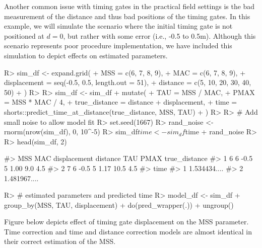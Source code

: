 \documentclass[
]{jss}
\begin{document}
Another common issue with timing gates in the practical field settings is the bad measurement of the distance and thus bad positions of the timing gates. In this example, we will simulate the scenario where the initial timing gate is not positioned at \(d=0\), but rather with some error (i.e., -0.5 to 0.5m). Although this scenario represents poor procedure implementation, we have included this simulation to depict effects on estimated parameters.

\begin{CodeChunk}
\begin{CodeInput}
R> sim_df <- expand.grid(
+   MSS = c(6, 7, 8, 9),
+   MAC = c(6, 7, 8, 9),
+   displacement = seq(-0.5, 0.5, length.out = 51),
+   distance = c(5, 10, 20, 30, 40, 50)
+ )
R> 
R> sim_df <- sim_df %
+   mutate(
+     TAU = MSS / MAC,
+     PMAX = MSS * MAC / 4,
+     true_distance = distance + displacement,
+     time = shorts::predict_time_at_distance(true_distance, MSS, TAU)
+   )
R> 
R> # Add small noise to allow model fit
R> set.seed(1667)
R> rand_noise <- rnorm(nrow(sim_df), 0, 10^-5)
R> sim_df$time <- sim_df$time + rand_noise
R> 
R> head(sim_df, 2)
\end{CodeInput}
\begin{CodeOutput}
#>   MSS MAC displacement distance  TAU PMAX true_distance
#> 1   6   6         -0.5        5 1.00  9.0           4.5
#> 2   7   6         -0.5        5 1.17 10.5           4.5
#>           time
#> 1 1.534434....
#> 2 1.481967....
\end{CodeOutput}
\end{CodeChunk}

\begin{CodeChunk}
\begin{CodeInput}
R> # estimated parameters and predicted time
R> model_df <- sim_df %
+   group_by(MSS, TAU, displacement) %
+   do(pred_wrapper(.)) %
+   ungroup()
\end{CodeInput}
\end{CodeChunk}

Figure below depicts effect of timing gate displacement on the MSS parameter. Time correction and time and distance correction models are almost identical in their correct estimation of the MSS.
\end{document}
